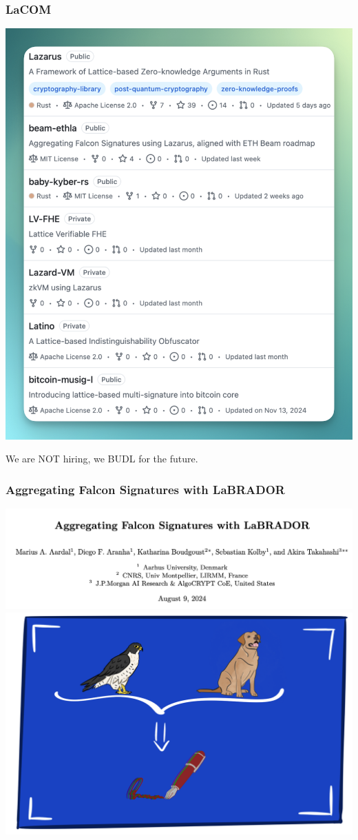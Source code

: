 \documentclass{beamer}
\begin{document}
\begin{frame}
	\frametitle{LaCOM}
	\includegraphics[scale=0.3]{lacom.png}
	
	\small{We are NOT hiring, we BUDL for the future.}
\end{frame}

\begin{frame}
\frametitle{Aggregating Falcon Signatures with LaBRADOR}
\includegraphics[scale=0.3]{agg-falcon-paper.png}
\includegraphics[scale=0.3]{agg-f-l.png}
\end{frame}
\end{document}
